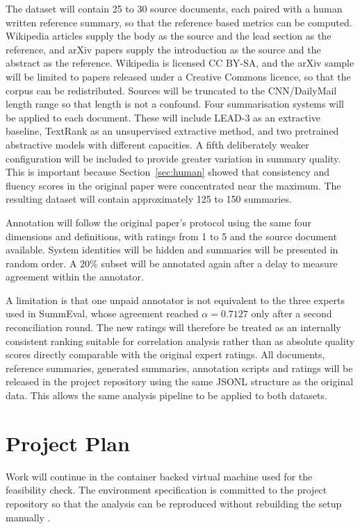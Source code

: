 \documentclass[11pt]{article}
\begin{document}
The dataset will contain 25 to 30 source documents, each paired with a human written reference summary, so that the reference based metrics can be computed. Wikipedia articles supply the body as the source and the lead section as the reference, and arXiv papers supply the introduction as the source and the abstract as the reference. Wikipedia is licensed CC BY-SA, and the arXiv sample will be limited to papers released under a Creative Commons licence, so that the corpus can be redistributed. Sources will be truncated to the CNN/DailyMail length range so that length is not a confound. Four summarisation systems will be applied to each document. These will include LEAD-3 as an extractive baseline, TextRank as an unsupervised extractive method, and two pretrained abstractive models with different capacities. A fifth deliberately weaker configuration will be included to provide greater variation in summary quality. This is important because Section~\ref{sec:human} showed that consistency and fluency scores in the original paper were concentrated near the maximum. The resulting dataset will contain approximately 125 to 150 summaries.

Annotation will follow the original paper's protocol using the same four dimensions and definitions, with ratings from 1 to 5 and the source document available. System identities will be hidden and summaries will be presented in random order. A 20\% subset will be annotated again after a delay to measure agreement within the annotator.

A limitation is that one unpaid annotator is not equivalent to the three experts used in SummEval, whose agreement reached $\alpha = 0.7127$ only after a second reconciliation round. The new ratings will therefore be treated as an internally consistent ranking suitable for correlation analysis rather than as absolute quality scores directly comparable with the original expert ratings. All documents, reference summaries, generated summaries, annotation scripts and ratings will be released in the project repository using the same JSONL structure as the original data. This allows the same analysis pipeline to be applied to both datasets.

\section{Project Plan}
\label{sec:plan}

Work will continue in the container backed virtual machine used for the feasibility check. The environment specification is committed to the project repository so that the analysis can be reproduced without rebuilding the setup manually \citep{howe-2012-virtual}.
\end{document}
